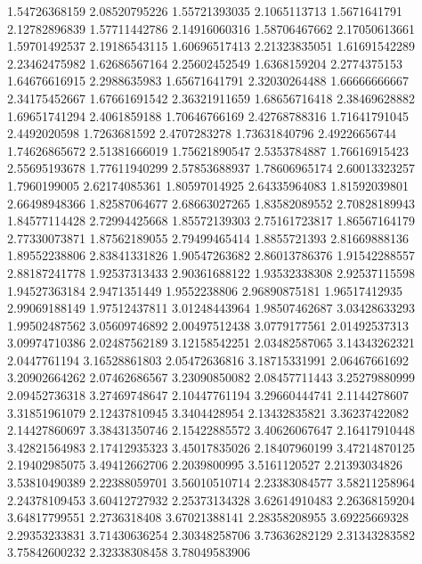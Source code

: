   1.54726368159    2.08520795226
  1.55721393035     2.1065113713
   1.5671641791    2.12782896839
  1.57711442786    2.14916060316
  1.58706467662    2.17050613661
  1.59701492537    2.19186543115
  1.60696517413    2.21323835051
  1.61691542289    2.23462475982
  1.62686567164    2.25602452549
   1.6368159204     2.2774375153
  1.64676616915     2.2988635983
  1.65671641791    2.32030264488
  1.66666666667    2.34175452667
  1.67661691542    2.36321911659
  1.68656716418    2.38469628882
  1.69651741294     2.4061859188
  1.70646766169    2.42768788316
  1.71641791045     2.4492020598
   1.7263681592     2.4707283278
  1.73631840796    2.49226656744
  1.74626865672    2.51381666019
  1.75621890547     2.5353784887
  1.76616915423    2.55695193678
  1.77611940299    2.57853688937
  1.78606965174    2.60013323257
   1.7960199005    2.62174085361
  1.80597014925    2.64335964083
  1.81592039801    2.66498948366
  1.82587064677    2.68663027265
  1.83582089552    2.70828189943
  1.84577114428    2.72994425668
  1.85572139303    2.75161723817
  1.86567164179    2.77330073871
  1.87562189055    2.79499465414
   1.8855721393    2.81669888136
  1.89552238806    2.83841331826
  1.90547263682    2.86013786376
  1.91542288557    2.88187241778
  1.92537313433    2.90361688122
  1.93532338308    2.92537115598
  1.94527363184     2.9471351449
   1.9552238806    2.96890875181
  1.96517412935    2.99069188149
  1.97512437811    3.01248443964
  1.98507462687    3.03428633293
  1.99502487562    3.05609746892
  2.00497512438     3.0779177561
  2.01492537313    3.09974710386
  2.02487562189    3.12158542251
  2.03482587065    3.14343262321
   2.0447761194    3.16528861803
  2.05472636816    3.18715331991
  2.06467661692    3.20902664262
  2.07462686567    3.23090850082
  2.08457711443    3.25279880999
  2.09452736318    3.27469748647
  2.10447761194    3.29660444741
   2.1144278607    3.31851961079
  2.12437810945     3.3404428954
  2.13432835821    3.36237422082
  2.14427860697    3.38431350746
  2.15422885572    3.40626067647
  2.16417910448    3.42821564983
  2.17412935323    3.45017835026
  2.18407960199    3.47214870125
  2.19402985075    3.49412662706
   2.2039800995     3.5161120527
  2.21393034826    3.53810490389
  2.22388059701    3.56010510714
  2.23383084577    3.58211258964
  2.24378109453    3.60412727932
  2.25373134328    3.62614910483
  2.26368159204    3.64817799551
   2.2736318408    3.67021388141
  2.28358208955    3.69225669328
  2.29353233831    3.71430636254
  2.30348258706    3.73636282129
  2.31343283582    3.75842600232
  2.32338308458    3.78049583906
